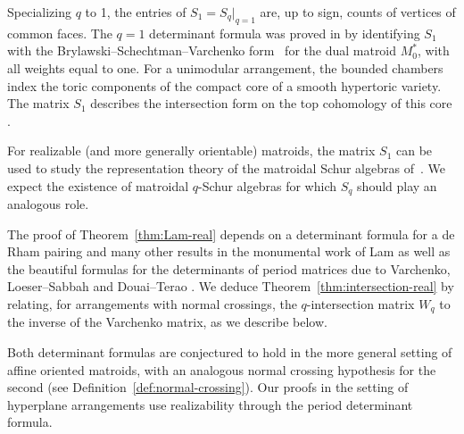 \begin{remark}
Specializing $q$ to 1, the entries of $S_1=S_q|_{q=1}$ are, up to sign, counts of vertices of common
faces. The $q=1$ determinant formula was proved in \cite[Theorem 1.4]{EM}
by identifying $S_1$ with the Brylawski--Schechtman--Varchenko form~\cite{SchechtmanVarchenko1991,BrylawskiVarchenko1997}
for the dual matroid $M_0^*$, with all weights equal to one.
For a unimodular arrangement, the bounded chambers index the toric
components of the compact core of a smooth hypertoric variety.
The matrix $S_1$ describes the intersection form on the top cohomology of this core
\cite{HauselSwartz2006}.

For realizable (and more generally orientable) matroids, the matrix $S_1$ can be used to study the representation theory of the matroidal Schur algebras of~\cite{Mautner,BradenMautner}.  We expect the existence of matroidal $q$-Schur algebras for which $S_q$ should play an analogous role.
\end{remark}


The proof of Theorem~\ref{thm:Lam-real} depends on a determinant formula for a de Rham pairing and many other results in the monumental work of Lam \cite{Lam} as well as the beautiful formulas for the determinants of period matrices due to Varchenko, Loeser--Sabbah and Douai--Terao \cite{Varchenko1990,LoeserSabbah1991,DouaiTerao1997}. We deduce Theorem~\ref{thm:intersection-real} by relating, for arrangements with normal crossings, the $q$-intersection matrix $W_q$ to the inverse of the Varchenko matrix, as we describe below.

\begin{remark}
Both determinant formulas are conjectured to hold in the more general setting of affine oriented
matroids, with an analogous normal crossing hypothesis for the second (see Definition~\ref{def:normal-crossing}). Our proofs
in the setting of hyperplane arrangements use realizability through the period determinant formula.
\end{remark}


